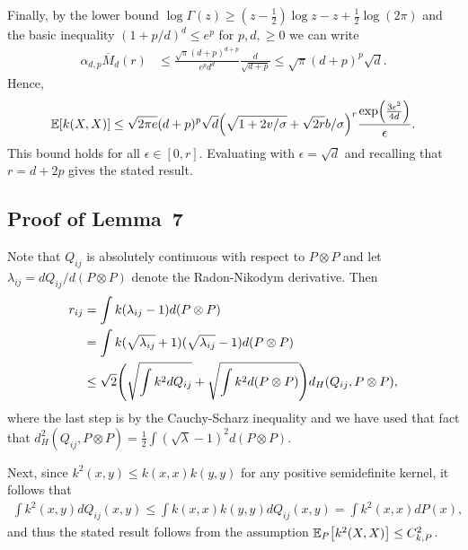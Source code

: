 \documentclass{article}
\theoremstyle{definition}
\newcommand{\bEx}{\ensuremath{\mathbb{E}}}
\newcommand{\ex}[1]{\ensuremath{\mathbb{E}\left[ #1\right]}}
\newcommand{\eps}{\epsilon}
\let\originalleft\left
\let\originalright\right
\renewcommand{\left}{\mathopen{}\mathclose\bgroup\originalleft}
\renewcommand{\right}{\aftergroup\egroup\originalright}
\begin{document}
Finally, by the lower bound  $\log \Gamma(z)\ge  (z -\frac{1}{2}) \log z  - z + \frac{1}{2} \log(2 \pi) $  and the basic inequality $(1 + p/d)^d \le e^p$ for $p,d, \ge 0$  we can write 
\begin{align*}
\alpha_{d,p} \overline{M}_d(r) %
& \le    \frac{\sqrt{ \pi }   (d+p )^{d+p} }{e^p d^{d}}   \frac{ d}{ \sqrt{ d + p}}\le    \sqrt{ \pi }   (d+p )^{p}   \sqrt{d}.
\end{align*}
Hence, 
\begin{align*}
 \ex{ k(X,X)}  \le  \sqrt{2 \pi e}   (d+p )^{p}    \sqrt{d}  \left( \sqrt{1+2v/\sigma} + \sqrt{2r} b/\sigma \right)^r  \frac{  \exp\left(  \frac{ 3 \eps^2}{ 4 d}  \right)} {\eps}.
\end{align*}
This bound holds for all $\eps \in [0,r]$. Evaluating with $\eps = \sqrt{d}$ and recalling that $r = d + 2p$ gives the stated result.


\subsection{Proof of Lemma~7}
Note that $Q_{ij}$ is absolutely continuous with respect to $P \otimes P$ and let $\lambda_{ij}= d Q_{ij}/d (P \otimes P)$ denote the Radon-Nikodym derivative. Then
\begin{align*}
    r_{ij} &= \int k (\lambda_{ij} - 1) d (P\otimes P) \\
    & =\int k (\sqrt{\lambda_{ij}} + 1)(\sqrt{\lambda_{ij}} - 1)  d (P\otimes P)\\
    & \le  \sqrt{2} \left( \sqrt{ \int k^2  d Q_{ij} } +\sqrt{ \int k^2  d (P \otimes P)} \right)  d_H(Q_{ij} , P \otimes P) , 
\end{align*}
where the last step is by the Cauchy-Scharz inequality and we have used that fact that $d^2_H(Q_{ij}, P\otimes P) =  \frac{1}{2} \int (\sqrt{\lambda} - 1)^2 d(P \otimes P)$.

Next, since $k^2(x,y) \le k(x,x) k(y,y)$ for any positive semidefinite kernel, it follows that
\begin{align*}
    \int k^2(x,y)   d Q_{ij}(x,y) \le   \int k(x,x) k(y,y)    d Q_{ij}(x,y) = \int k^2(x,x) dP(x),
\end{align*}
and thus the stated result follows from the assumption $\bEx_{P}\left[k^2(X,X)\right] \le C_{k,P}^2$. 
\end{document}
